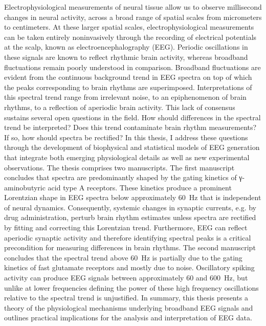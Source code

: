 \documentclass[11pt]{report}
\begin{document}
Electrophysiological measurements of neural tissue allow us to observe millisecond changes in neural activity, across a broad range of spatial scales from micrometers to centimeters. At these larger spatial scales, electrophysiological measurements can be taken entirely noninvasively through the recording of electrical potentials at the scalp, known as electroencephalography (EEG). Periodic oscillations in these signals are known to reflect rhythmic brain activity, whereas broadband fluctuations remain poorly understood in comparison. Broadband fluctuations are evident from the continuous background trend in EEG spectra on top of which the peaks corresponding to brain rhythms are superimposed. Interpretations of this spectral trend range from irrelevant noise, to an epiphenomenon of brain rhythms, to a reflection of aperiodic brain activity. This lack of consensus sustains several open questions in the field. How should differences in the spectral trend be interpreted? Does this trend contaminate brain rhythm measurements? If so, how should spectra be rectified? In this thesis, I address these questions through the development of biophysical and statistical models of EEG generation that integrate both emerging physiological details as well as new experimental observations. The thesis comprises two manuscripts. The first manuscript concludes that spectra are predominantly shaped by the gating kinetics of γ-aminobutyric acid type A receptors. These kinetics produce a prominent Lorentzian shape in EEG spectra below approximately \qty{60}{\hertz} that is independent of neural dynamics. Consequently, systemic changes in synaptic currents, e.g. by drug administration, perturb brain rhythm estimates unless spectra are rectified by fitting and correcting this Lorentzian trend. Furthermore, EEG can reflect aperiodic synaptic activity and therefore identifying spectral peaks is a critical precondition for measuring differences in brain rhythms. The second manuscript concludes that the spectral trend above \qty{60}{\hertz} is partially due to the gating kinetics of fast glutamate receptors and mostly due to noise. Oscillatory spiking activity can produce EEG signals between approximately 60 and \qty{600}{\hertz}, but unlike at lower frequencies defining the power of these high frequency oscillations relative to the spectral trend is unjustified. In summary, this thesis presents a theory of the physiological mechanisms underlying broadband EEG signals and outlines practical implications for the analysis and interpretation of EEG data.
\end{document}
